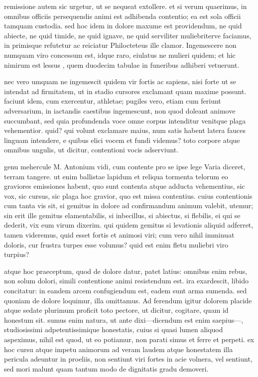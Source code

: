  remissione autem sic urgetur, ut se nequeat extollere. et si verum quaerimus, in omnibus officiis persequendis animi est adhibenda contentio; ea est sola officii tamquam custodia. sed hoc idem in dolore maxume est providendum, ne quid abiecte, ne quid timide, ne quid ignave, ne quid serviliter muliebriterve faciamus, in primisque refutetur ac reiciatur Philocteteus ille clamor. Ingemescere non numquam viro concessum est, idque raro, eiulatus ne mulieri quidem; et hic nimirum est lessus , quem duodecim tabulae in funeribus adhiberi vetuerunt.

 nec vero umquam ne ingemescit quidem vir fortis ac sapiens, nisi forte ut se intendat ad firmitatem, ut in stadio cursores exclamant quam maxime possunt. faciunt idem, cum exercentur, athletae; pugiles vero, etiam cum feriunt adversarium, in iactandis caestibus ingemescunt, non quod doleant animove succumbant, sed quia profundenda voce omne corpus intenditur venitque plaga vehementior. quid? qui volunt exclamare maius, num satis habent latera fauces linguam intendere, e quibus elici vocem et fundi videmus? toto corpore atque omnibus ungulis, ut dicitur, contentioni vocis adserviunt.

 genu mehercule M. Antonium vidi, cum contente pro se ipse lege Varia diceret, terram tangere. ut enim ballistae lapidum et reliqua tormenta telorum eo graviores emissiones habent, quo sunt contenta atque adducta vehementius, sic vox, sic cursus, sic plaga hoc gravior, quo est missa contentius. cuius contentionis cum tanta vis sit, si gemitus in dolore ad confirmandum animum valebit, utemur; sin erit ille gemitus elamentabilis, si inbecillus, si abiectus, si flebilis, ei qui se dederit, vix eum virum dixerim. qui quidem gemitus si levationis aliquid adferret, tamen videremus, quid esset fortis et animosi viri; cum vero nihil imminuat doloris, cur frustra turpes esse volumus? quid est enim fletu muliebri viro turpius?

 atque hoc praeceptum, quod de dolore datur, patet latius: omnibus enim rebus, non solum dolori, simili contentione animi resistendum est. ira exardescit, libido concitatur: in eandem arcem confugiendum est, eadem sunt arma sumenda. sed quoniam de dolore loquimur, illa omittamus. Ad ferendum igitur dolorem placide atque sedate plurimum proficit toto pectore, ut dicitur, cogitare, quam id honestum sit. sumus enim natura, ut ante dixi—dicendum est enim saepius—, studiosissimi adpetentissimique honestatis, cuius si quasi lumen aliquod aspeximus, nihil est quod, ut eo potiamur, non parati simus et ferre et perpeti. ex hoc cursu atque impetu animorum ad veram laudem atque honestatem illa pericula adeuntur in proeliis, non sentiunt viri fortes in acie volnera, vel sentiunt, sed mori malunt quam tantum modo de dignitatis gradu demoveri.

